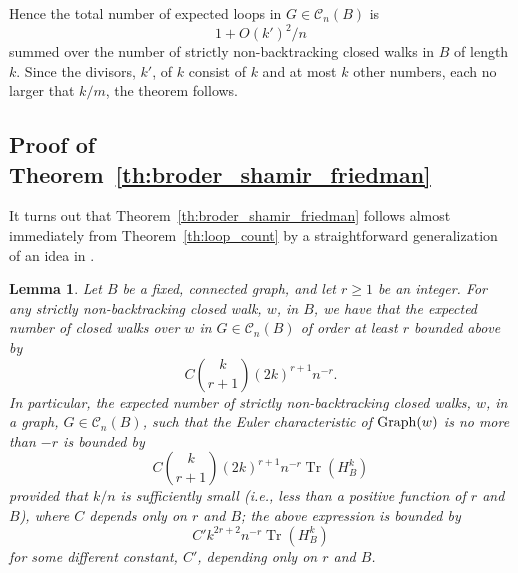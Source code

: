 \documentclass{memo-l}
\theoremstyle{plain}
\newtheorem{lemma}[theorem]{Lemma}
\theoremstyle{definition}
\numberwithin{section}{chapter}
\numberwithin{equation}{chapter}
\DeclareMathOperator{\Tr}{Tr}
\theoremstyle{plain}
\theoremstyle{definition}
\newcommand\cC{\mathcal{C}}
\begin{document}
Hence the total number of expected loops in $G\in\cC_n(B)$ is
$$
1 + O(k')^2/n
$$
summed over the number of strictly non-backtracking closed walks in $B$ of 
length $k$.  Since the divisors, $k'$, of $k$ consist of $k$ and at
most $k$ other numbers, each no larger that $k/m$, the theorem
follows.

\subsection{Proof of Theorem~\ref{th:broder_shamir_friedman}}

It turns out that Theorem~\ref{th:broder_shamir_friedman} follows
almost immediately from Theorem~\ref{th:loop_count} by a straightforward
generalization of an idea in \cite{broder}.

\begin{lemma}\label{le:coincidences}
Let $B$ be a fixed, connected graph, and let $r\ge 1$ be an integer.
For any strictly non-backtracking closed walk, $w$, in $B$,
we have that the expected number of closed walks 
over $w$ in $G\in\cC_n(B)$ of 
order at least $r$
bounded above by
\begin{equation}\label{eq:individual_word_bound}
C\binom{k}{r+1} (2k)^{r+1} n^{-r}.
\end{equation}
In particular,
the expected number of strictly non-backtracking closed
walks, $w$, in a graph, $G\in \cC_n(B)$, such
that the Euler characteristic of ${\rm Graph}(w)$ is no more than
$-r$ is bounded by
\begin{equation}\label{eq:first_coincidence_bound}
C \binom{k}{r+1} (2k)^{r+1} n^{-r} \Tr(H_B^k) 
\end{equation}
provided that $k/n$ is sufficiently small (i.e., less than a positive
function of $r$ and $B$),
where $C$ depends only on $r$ and $B$; the above expression is
bounded by
\begin{equation}\label{eq:second_coincidence_bound}
C' k^{2r+2} n^{-r} \Tr(H_B^k)
\end{equation}
for some different constant, $C'$, depending only on $r$ and $B$.
\end{lemma}
\end{document}
